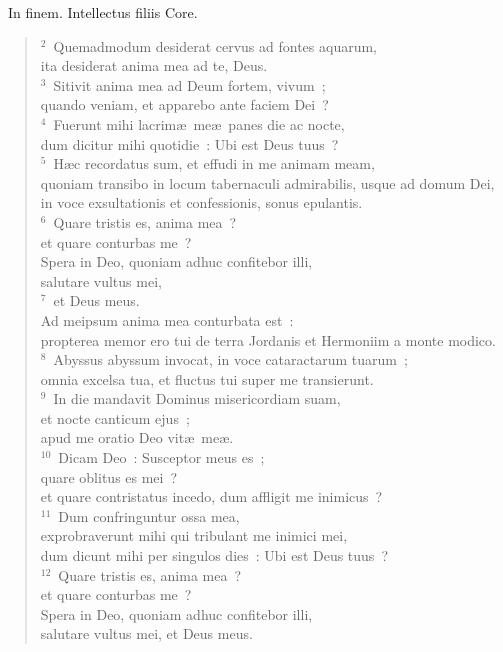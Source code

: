 ~\lettrine[lines=10,image=true,loversize=0.05,lraise=-0.03]{I}{}n finem. Intellectus filiis Core.
\begin{flushleft}\begin{verse}\vspace{6pt}${}^{2}$~Quemadmodum desiderat cervus ad fontes aquarum,\\ ita desiderat anima mea ad te, Deus.\\
${}^{3}$~Sitivit anima mea ad Deum fortem, vivum~;\\ quando veniam, et apparebo ante faciem Dei~?\\
${}^{4}$~Fuerunt mihi lacrim\ae\ me\ae\ panes die ac nocte,\\ dum dicitur mihi quotidie~: Ubi est Deus tuus~?\\
${}^{5}$~H\ae c recordatus sum, et effudi in me animam meam,\\ quoniam transibo in locum tabernaculi admirabilis, usque ad domum Dei,\\ in voce exsultationis et confessionis, sonus epulantis.\\
${}^{6}$~Quare tristis es, anima mea~?\\ et quare conturbas me~?\\ Spera in Deo, quoniam adhuc confitebor illi,\\ salutare vultus mei,\\
${}^{7}$~et Deus meus.\\ Ad meipsum anima mea conturbata est~:\\ propterea memor ero tui de terra Jordanis et Hermoniim a monte modico.\\
${}^{8}$~Abyssus abyssum invocat, in voce cataractarum tuarum~;\\ omnia excelsa tua, et fluctus tui super me transierunt.\\
${}^{9}$~In die mandavit Dominus misericordiam suam,\\ et nocte canticum ejus~;\\ apud me oratio Deo vit\ae\ me\ae .\\
${}^{10}$~Dicam Deo~: Susceptor meus es~;\\ quare oblitus es mei~?\\ et quare contristatus incedo, dum affligit me inimicus~?\\
${}^{11}$~Dum confringuntur ossa mea,\\ exprobraverunt mihi qui tribulant me inimici mei,\\ dum dicunt mihi per singulos dies~: Ubi est Deus tuus~?\\
${}^{12}$~Quare tristis es, anima mea~?\\ et quare conturbas me~?\\ Spera in Deo, quoniam adhuc confitebor illi,\\ salutare vultus mei, et Deus meus.\end{verse}\end{flushleft}


